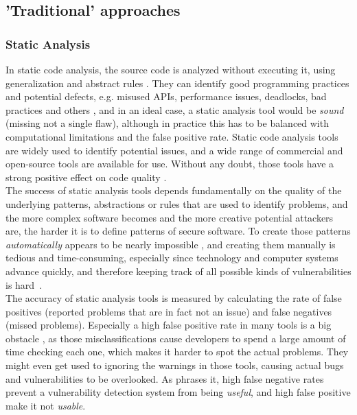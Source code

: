 \documentclass[
	a4paper,
	pagesize,
	pdftex,
	12pt,
	twoside, %
	BCOR=5mm, %
	ngerman,
	fleqn,
	final,
	]{scrartcl}
\begin{document}
\subsection{'Traditional' approaches}
\subsubsection{Static Analysis}
In static code analysis, the source code is analyzed without executing it, using generalization and abstract rules \cite{Ghaffarian.2017}. They can identify good programming practices and potential defects, e.g. misused APIs, performance issues, deadlocks, bad practices and others \cite{Venkatasubramanyam.2014}, and in an ideal case, a static analysis tool would be \textit{sound} (missing not a single flaw), although in practice this has to be balanced with computational limitations and the false positive rate. Static code analysis tools are widely used to identify potential issues, and a wide range of commercial and open-source tools are available for use. Without any doubt, those tools have a strong positive effect on code quality \cite{Liu.2018}. \\
The success of static analysis tools depends fundamentally on the quality of the underlying patterns, abstractions or rules that are used to identify problems, and the more complex software becomes and the more creative potential attackers are, the harder it is to define patterns of secure software. To create those patterns \textit{automatically} appears to be nearly impossible \cite{Rolim.2018, Yamaguchi.2012}, and creating them manually is tedious and time-consuming, especially since technology and computer systems advance quickly, and therefore keeping track of all possible kinds of vulnerabilities is hard~\cite{Ma.2017}.\\
The accuracy of static analysis tools is measured by calculating the rate of false positives (reported problems that are in fact not an issue) and false negatives (missed problems). Especially a high false positive rate in many tools is a big obstacle \cite[S.~1]{Liu.2018}, as those misclassifications cause developers to spend a large amount of time checking each one, which makes it harder to spot the actual problems. They might even get used to ignoring the warnings in those tools, causing actual bugs and vulnerabilities to be overlooked. As \cite{Li.2005} phrases it, high false negative rates prevent a vulnerability detection system from being \textit{useful}, and high false positive make it not \textit{usable}.\\
\end{document}
